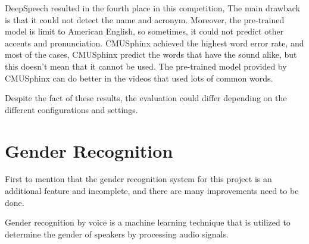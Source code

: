 \documentclass[natbib]{muthesis}
\begin{document}
 
 DeepSpeech resulted in the fourth place in this competition, The main drawback is that it could not detect the name and acronym. Moreover, the pre-trained model is limit to American English, so sometimes, it could not predict other accents and pronunciation. CMUSphinx achieved the highest word error rate, and most of the cases, CMUSphinx predict the words that have the sound alike, but this doesn't mean that it cannot be used. The pre-trained model provided by CMUSphinx can do better in the videos that used lots of common words.
 
 Despite the fact of these results, the evaluation could differ depending on the different configurations and settings.
 
 \chapter{Gender Recognition}
 First to mention that the gender recognition system for this project is an additional feature and incomplete, and there are many improvements need to be done.
 
 Gender recognition by voice is a machine learning technique that is utilized to determine the gender of speakers by processing audio signals.
 
 
\end{document}
